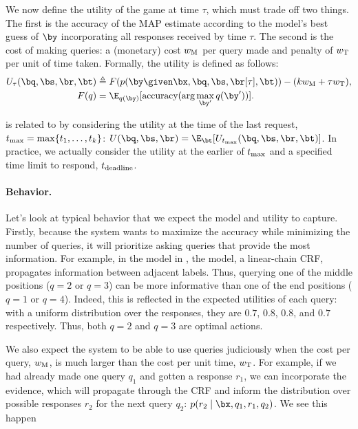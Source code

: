 We now define the utility of the game at time $\tau$, which must trade off two things.
The first is the accuracy of the MAP estimate according to the model's best guess of $\by$ incorporating all responses received by time $\tau$.
The second is the cost of making queries: a (monetary) cost $w_\text{M}$ per query made and penalty of $w_\text{T}$ per unit of time taken.
Formally, the utility is defined as follows:
\begin{align}
  \label{eqn:utility}
  U_\tau(\bq, \bs, \br, \bt) &\eqdef F(p(\by \given \bx, \bq, \bs, \br[\tau], \bt)) - (k \weightmoney + \tau \weighttime), \\
  F(q) &= \E_{q(\by)}[\accuracy(\arg\max_{\by'} q(\by'))].
\end{align}

 is related to  by considering the utility at the time of the last request, $t_\text{max} = \max\{t_1, \ldots, t_k\}$: $U(\bq, \bs, \br) = \E_{\bt}[U_{\tmax}(\bq, \bs, \br, \bt)]$.
In practice, we actually consider the utility at the earlier of $t_\text{max}$ and a specified time limit to respond, $t_\text{deadline}$.


\paragraph{Behavior.}
Let's look at typical behavior that we expect the model and utility to capture.
Firstly, because the system wants to maximize the accuracy while minimizing the number of queries, it will prioritize asking queries that provide the most information.
For example,
in the model in , the model, a linear-chain CRF, propagates information between adjacent labels. 
Thus, querying one of the middle positions ($q = 2$ or $q = 3$) can be more informative than one of the end positions ($q = 1$ or $q = 4$).
Indeed, this is reflected in the expected utilities of each query: with a uniform distribution over the responses, they are $0.7$, $0.8$, $0.8$, and $0.7$ respectively. Thus, both $q = 2$ and $q = 3$ are optimal actions. 

We also expect the system to be able to use queries judiciously when the cost per query, $w_\text{M}$, is much larger than the cost per unit time, $w_\text{T}$.
For example,
if we had already made one query $q_1$ and gotten a response $r_1$,
we can incorporate the evidence, which will propagate through the CRF
and inform the distribution over possible responses $r_2$ for the next query $q_2$:
$p(r_2 \mid \bx, q_1, r_1, q_2)$.
We see this happen 

